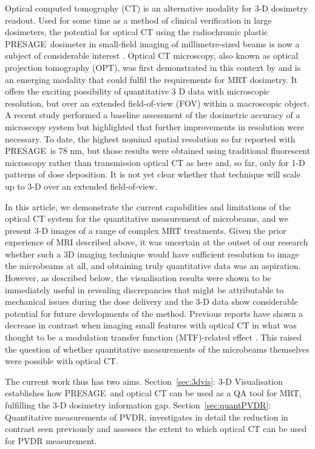 	Optical computed tomography (CT) \cite{doranthe2009, goreradiation1996}  is an alternative modality for 3-D dosimetry readout. Used for some time as a method of clinical verification in large dosimeters, the potential for optical CT using the radiochromic plastic PRESAGE\textregistered \ dosimeter in small-field imaging of millimetre-sized beams is now a subject of considerable interest \cite{clift2010toward}. Optical CT microscopy, also known as optical projection tomography (OPT), was first demonstrated in this context by \cite{doranan2010} and is an emerging modality that could fulfil the requirements for MRT dosimetry. It offers the exciting possibility of quantitative 3 D data with microscopic resolution, but over an extended field-of-view (FOV) within a macroscopic object. A recent study \cite{doranestablishing2013} performed a baseline assessment of the dosimetric accuracy of a microscopy system but highlighted that further improvements in resolution were necessary. To date, the highest nominal spatial resolution so far reported with PRESAGE\textregistered  \ is 78 nm, but those results were obtained using traditional fluorescent microscopy \cite{annabellevaluating2012} rather than transmission optical CT as here and, so far, only for 1-D patterns of dose deposition. It is not yet clear whether that technique will scale up to 3-D over an extended field-of-view.
	
	In this article, we demonstrate the current capabilities and limitations of the optical CT system for the quantitative measurement of microbeams, and we present 3-D images of a range of complex MRT treatments. Given the prior experience of MRI described above, it was uncertain at the outset of our research whether such a 3D imaging technique would have sufficient resolution to image the microbeams at all, and obtaining truly quantitative data was an aspiration. However, as described below, the visualisation results were shown to be immediately useful in revealing discrepancies that might be attributable to mechanical issues during the dose delivery and the 3-D data show considerable potential for future developments of the method. Previous reports have shown a decrease in contrast when imaging small features with optical CT in what was thought to be a modulation transfer function (MTF)-related effect \cite{doranultra-high2013}. This raised the question of whether quantitative measurements of the microbeams themselves were possible with optical CT.
	
	The current work thus has two aims. Section~\ref{sec:3dvis}: 3-D Visualisation establishes how PRESAGE\textregistered \ and optical CT can be used as a QA tool for MRT, fulfilling the 3-D dosimetry information gap. Section~\ref{sec:quantPVDR}: Quantitative measurements of PVDR, investigates in detail the reduction in contrast seen previously and assesses the extent to which optical CT can be used for PVDR measurement. 
	

